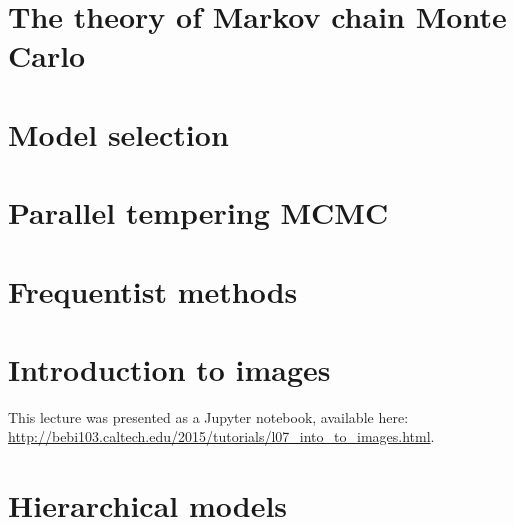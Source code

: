 \documentclass [12pt,letter]{article}
\theoremstyle{plain}
\theoremstyle{plain}
\theoremstyle{definition}
\theoremstyle{definition}
\numberwithin{equation}{section}
\begin{document}
\section{The theory of Markov chain Monte Carlo}
\label{sec:mcmc}


\pagebreak

\section{Model selection}
\label{sec:model_selection}



\pagebreak


\section{Parallel tempering MCMC}
\label{sec:parallel_tempering}



\pagebreak

\section{Frequentist methods}
\label{sec:frequentist_methods}



\section{Introduction to images}
\label{sec:intro_to_images}
This lecture was presented as a Jupyter notebook, available here:
\url{http://bebi103.caltech.edu/2015/tutorials/l07_into_to_images.html}.

\pagebreak

\section{Hierarchical models}
\label{sec:hierarchical_models}

\end{document}

